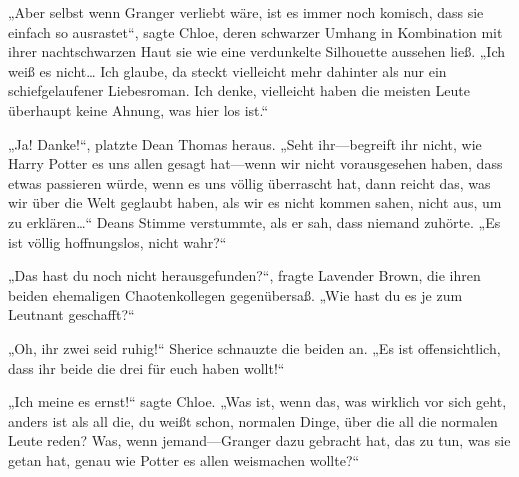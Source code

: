 „Aber selbst wenn Granger verliebt wäre, ist es immer noch komisch, dass sie einfach so ausrastet“, sagte Chloe, deren schwarzer Umhang in Kombination mit ihrer nachtschwarzen Haut sie wie eine verdunkelte Silhouette aussehen ließ. „Ich weiß es nicht… Ich glaube, da steckt vielleicht mehr dahinter als nur ein schiefgelaufener Liebesroman. Ich denke, vielleicht haben die meisten Leute überhaupt keine Ahnung, was hier los ist.“

„Ja! Danke!“, platzte Dean Thomas heraus. „Seht ihr—begreift ihr nicht, wie Harry Potter es uns allen gesagt hat—wenn wir nicht vorausgesehen haben, dass etwas passieren würde, wenn es uns völlig überrascht hat, dann reicht das, was wir über die Welt geglaubt haben, als wir es nicht kommen sahen, nicht aus, um zu erklären…“ Deans Stimme verstummte, als er sah, dass niemand zuhörte. „Es ist völlig hoffnungslos, nicht wahr?“

„Das hast du noch nicht herausgefunden?“, fragte Lavender Brown, die ihren beiden ehemaligen Chaotenkollegen gegenübersaß. „Wie hast du es je zum Leutnant geschafft?“

„Oh, ihr zwei seid ruhig!“ Sherice schnauzte die beiden an. „Es ist offensichtlich, dass ihr beide die drei für euch haben wollt!“

„Ich meine es ernst!“ sagte Chloe. „Was ist, wenn das, was wirklich vor sich geht, anders ist als all die, du weißt schon, normalen Dinge, über die all die normalen Leute reden? Was, wenn jemand—Granger dazu gebracht hat, das zu tun, was sie getan hat, genau wie Potter es allen weismachen wollte?“

